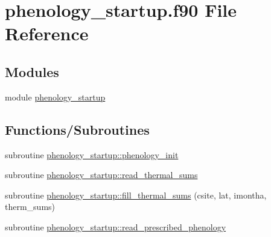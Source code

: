 \hypertarget{phenology__startup_8f90}{}\section{phenology\+\_\+startup.\+f90 File Reference}
\label{phenology__startup_8f90}
\subsection*{Modules}
\begin{DoxyCompactItemize}
\item 
module \hyperlink{namespacephenology__startup}{phenology\+\_\+startup}
\end{DoxyCompactItemize}
\subsection*{Functions/\+Subroutines}
\begin{DoxyCompactItemize}
\item 
subroutine \hyperlink{namespacephenology__startup_abebba7585ef5aec3dd00f7cfa0b56067}{phenology\+\_\+startup\+::phenology\+\_\+init}
\item 
subroutine \hyperlink{namespacephenology__startup_aca2b4422c059ad87aee0f7aa7f7c8964}{phenology\+\_\+startup\+::read\+\_\+thermal\+\_\+sums}
\item 
subroutine \hyperlink{namespacephenology__startup_a7e3ac783d1459d2f3ac41c2af6d761c9}{phenology\+\_\+startup\+::fill\+\_\+thermal\+\_\+sums} (csite, lat, imontha, therm\+\_\+sums)
\item 
subroutine \hyperlink{namespacephenology__startup_aa83586e75a022d6fcb5816972361282d}{phenology\+\_\+startup\+::read\+\_\+prescribed\+\_\+phenology}
\end{DoxyCompactItemize}
